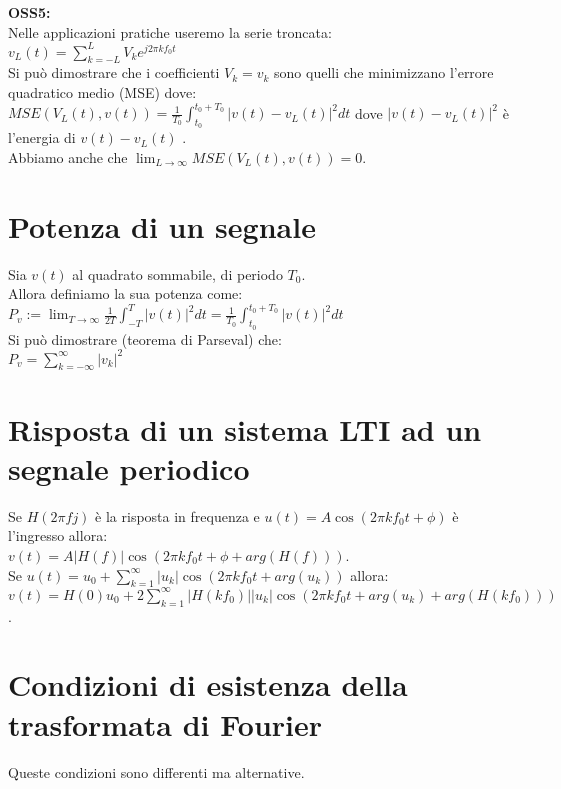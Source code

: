 	\textbf{OSS5:}\\
	Nelle applicazioni pratiche useremo la serie troncata:\\
	$ v_L(t) = \sum_{k= -L}^{ L} V_k e^{j 2 \pi k f_0 t}$\\
	Si può dimostrare che i coefficienti $ V_k = v_k $ sono quelli che minimizzano l'errore quadratico medio (MSE) dove:\\ 
	$
	MSE(V_L(t), v(t))
	= \frac{1}{T_0} \int_{t_0}^{ t_0+T_0} |v(t) - v_L(t)|^2 dt
	$ dove $ |v(t) - v_L(t)|^2 $ è l'energia di $ v(t) - v_L(t)$ .\\
	Abbiamo anche che $ \lim_{L \to \infty}  MSE(V_L(t), v(t)) = 0$.
	
\section{Potenza di un segnale}
	
	Sia $ v(t) $ al quadrato sommabile, di periodo $ T_0$.\\
	Allora definiamo la sua potenza come:\\
	$
		P_v
		:= \lim_{T \to \infty} \frac{1}{ 2 T} \int_{-T}^{ T} |v(t)|^2 dt
		= \frac{1}{T_0} \int_{t_0}^{t_0+T_0} |v(t)|^2 dt
	$\\
	Si può dimostrare (teorema di Parseval) che:\\
	$
		P_v
		= \sum_{k= -\infty}^{ \infty}  |v_k|^2
	$\\

\section{Risposta di un sistema LTI ad un segnale periodico}
	Se $ H(2 \pi fj) $ è la risposta in frequenza e $ u(t) = A \cos (2 \pi k f_0 t + \phi) $ è l'ingresso allora:\\
	$
		v(t)
		= A |H(f)| \cos ( 2 \pi k f_0 t + \phi + arg( H(f)))
	$.\\
	Se $ u(t) = u_0 + \sum_{k= 1}^{ \infty} |u_k| \cos ( 2 \pi k f_0 t + arg(u_k)) $ allora:\\
	$
	v(t)
	= H(0)u_0 + 2 \sum_{k= 1}^{ \infty} |H(k f_0)| |u_k| \cos ( 2 \pi k f_0 t + arg(u_k) + arg(H(kf_0)))
	$.\\

\section{Condizioni di esistenza della trasformata di Fourier}
	
	Queste condizioni sono differenti ma alternative.\\
	
